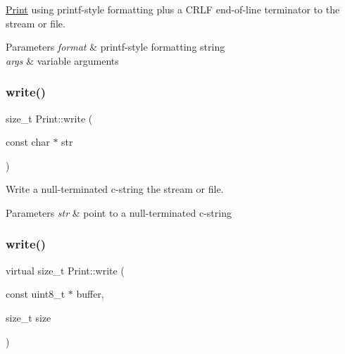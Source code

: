 \mbox{\hyperlink{class_print}{Print}} using printf-\/style formatting plus a C\+R\+LF end-\/of-\/line terminator to the stream or file. 


\begin{DoxyParams}{Parameters}
{\em format} & printf-\/style formatting string\\
\hline
{\em args} & variable arguments \\
\hline
\end{DoxyParams}
\mbox{\label{class_print_a5b40e0e9cab1f2fe5bb0cb22ffe5adda}} 
\subsubsection{\texorpdfstring{write()}{write()}\hspace{0.1cm}{\footnotesize\ttfamily [1/2]}}
{\footnotesize\ttfamily size\+\_\+t Print\+::write (\begin{DoxyParamCaption}\item[{const char $\ast$}]{str }\end{DoxyParamCaption})\hspace{0.3cm}{\ttfamily [inline]}}



Write a null-\/terminated c-\/string the stream or file. 


\begin{DoxyParams}{Parameters}
{\em str} & point to a null-\/terminated c-\/string \\
\hline
\end{DoxyParams}
\mbox{\label{class_print_a88864e109589a5be9b0f5ba1327f8421}} 
\subsubsection{\texorpdfstring{write()}{write()}\hspace{0.1cm}{\footnotesize\ttfamily [2/2]}}
{\footnotesize\ttfamily virtual size\+\_\+t Print\+::write (\begin{DoxyParamCaption}\item[{const uint8\+\_\+t $\ast$}]{buffer,  }\item[{size\+\_\+t}]{size }\end{DoxyParamCaption})\hspace{0.3cm}{\ttfamily [virtual]}}



